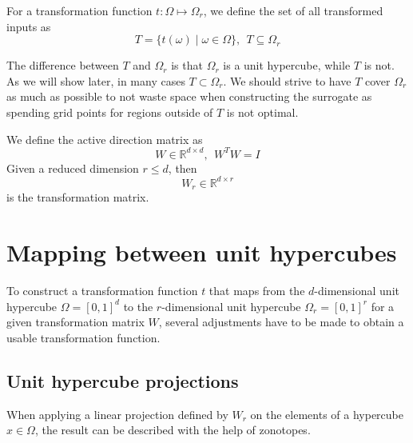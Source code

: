 \documentclass[
  a4paper,  %
  twoside,  %
  bibliography=totoc,
  headsepline,
  cleardoublepage=empty,
  parskip=half,
  draft=false
]{scrbook}
\begin{document}
\begin{definition}
For a transformation function $t \colon \Omega \mapsto \Omega_r$, we define the set of all transformed inputs as
\begin{equation}
T=\{t(\omega)\mid \omega\in\Omega\}, ~~ T \subseteq \Omega_r
\end{equation}
\end{definition}

The difference between $T$ and $\Omega_r$ is that $\Omega_r$ is a unit hypercube, while $T$ is not.
As we will show later, in many cases $T \subset \Omega_r$.
We should strive to have $T$ cover $\Omega_r$ as much as possible to not waste space when constructing the surrogate as spending grid points for regions outside of $T$ is not optimal.

\begin{definition}
We define the active direction matrix as
\begin{equation}
W \in \mathds{R}^{d \times d}, ~~  W^T W=I
\end{equation}
Given a reduced dimension $r \leq d$, then
\begin{equation}
W_r \in \mathds{R}^{d \times r}
\end{equation}
is the transformation matrix.
\end{definition}

\section{Mapping between unit hypercubes}

To construct a transformation function $t$ that maps from the $d$-dimensional unit hypercube $\Omega=[0,1]^d$ to the $r$-dimensional unit hypercube $\Omega_r=[0,1]^r$ for a given transformation matrix $W$, several adjustments have to be made to obtain a usable transformation function.

\subsection{Unit hypercube projections}

When applying a linear projection defined by $W_r$ on the elements of a hypercube $x \in \Omega$, the result can be described with the help of zonotopes.
\end{document}
